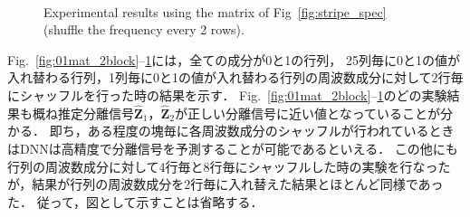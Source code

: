 \begin{figure}[!t]
  \centering
  \\
  \caption{Experimental results using the matrix of Fig~\ref{fig:stripe_spec} (shuffle the frequency every 2 rows).}
  \label{fig:stripe_2block}
\end{figure}

Fig.~\ref{fig:01mat_2block}--\ref{fig:stripe_2block}には，全ての成分が0と1の行列，
25列毎に0と1の値が入れ替わる行列，1列毎に0と1の値が入れ替わる行列の周波数成分に対して2行毎にシャッフルを行った時の結果を示す．
Fig.~\ref{fig:01mat_2block}--\ref{fig:stripe_2block}のどの実験結果も概ね推定分離信号$\hat{\bm{Z}}_1$，$\hat{\bm{Z}}_2$が正しい分離信号に近い値となっていることが分かる．
即ち，ある程度の塊毎に各周波数成分のシャッフルが行われているときはDNNは高精度で分離信号を予測することが可能であるといえる．
この他にも行列の周波数成分に対して4行毎と8行毎にシャッフルした時の実験を行なったが，結果が行列の周波数成分を2行毎に入れ替えた結果とほとんど同様であった．
従って，図として示すことは省略する．
\clearpage
